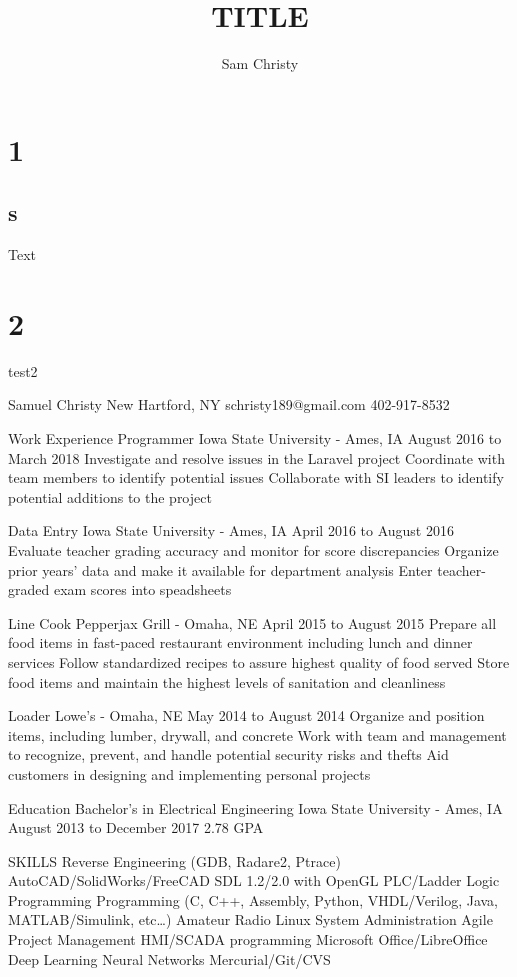 \documentclass{article}
\begin{document}
\title{TITLE}
\author{Sam Christy}
\maketitle

\section{1}
\subsection{s}
Text

\section{2}
test2


Samuel Christy
New Hartford, NY
schristy189@gmail.com
402-917-8532

Work Experience
Programmer
Iowa State University - Ames, IA
August 2016 to March 2018
Investigate and resolve issues in the Laravel project
Coordinate with team members to identify potential issues
Collaborate with SI leaders to identify potential additions to the project

Data Entry
Iowa State University - Ames, IA
April 2016 to August 2016
Evaluate teacher grading accuracy and monitor for score discrepancies
Organize prior years’ data and make it available for department analysis
Enter teacher-graded exam scores into speadsheets

Line Cook
Pepperjax Grill - Omaha, NE
April 2015 to August 2015
Prepare all food items in fast-paced restaurant environment including lunch and dinner services
Follow standardized recipes to assure highest quality of food served
Store food items and maintain the highest levels of sanitation and cleanliness

Loader
Lowe's - Omaha, NE
May 2014 to August 2014
Organize and position items, including lumber, drywall, and concrete
Work with team and management to recognize, prevent, and handle potential security risks and thefts
Aid customers in designing and implementing personal projects

Education
Bachelor's in Electrical Engineering
Iowa State University - Ames, IA
August 2013 to December 2017
2.78 GPA

SKILLS
Reverse Engineering (GDB, Radare2, Ptrace)
AutoCAD/SolidWorks/FreeCAD
SDL 1.2/2.0 with OpenGL
PLC/Ladder Logic Programming
Programming (C, C++, Assembly, Python, VHDL/Verilog, Java, MATLAB/Simulink, etc…)
Amateur Radio
Linux System Administration
Agile Project Management
HMI/SCADA programming
Microsoft Office/LibreOffice
Deep Learning Neural Networks
Mercurial/Git/CVS
\end{document}
